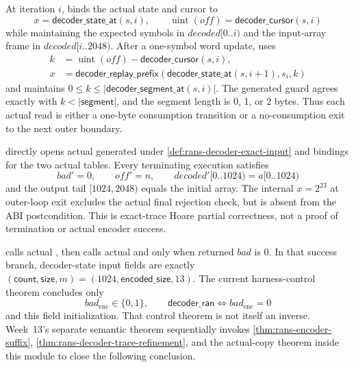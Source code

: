 \begin{definition}
\label{def:rans-decoder-trace-invariants}
At iteration \(i\),  binds the actual
state and cursor to
\[
  x=\mathsf{decoder\_state\_at}(s,i),\qquad
  \operatorname{uint}(off)=\mathsf{decoder\_cursor}(s,i)
\]
while maintaining the expected symbols in \(decoded[0..i)\) and the input-array
frame in \(decoded[i..2048)\). After a one-symbol word update,
 uses
\[
\begin{aligned}
  k&=\operatorname{uint}(off)-\mathsf{decoder\_cursor}(s,i),\\
  x&=\mathsf{decoder\_replay\_prefix}
       (\mathsf{decoder\_state\_at}(s,i+1),s_i,k)
\end{aligned}
\]
and maintains \(0\le k\le|\mathsf{decoder\_segment\_at}(s,i)|\). The generated
guard agrees exactly with \(k<|\mathsf{segment}|\), and the segment length is
0, 1, or 2 bytes. Thus each actual read is either a one-byte consumption
transition or a no-consumption exit to the next outer boundary.
\end{definition}

\begin{verified}
\label{thm:rans-decoder-trace-refinement}
 directly opens actual
generated  under
\cref{def:rans-decoder-exact-input} and bindings for the two actual tables.
Every terminating execution satisfies
\[
  bad'=0,\qquad off'=n,\qquad
  decoded'[0..1024)=a[0..1024)
\]
and the output tail \([1024,2048)\) equals the initial array. The internal
\(x=2^{23}\) at outer-loop exit excludes the actual final rejection check,
but is absent from the ABI postcondition. This is exact-trace Hoare partial
correctness, not a proof of termination or actual encoder success.
\end{verified}

\begin{definition}
\label{def:rans-actual-harness}
 calls actual ,
then calls actual  and
 only when returned \(bad\) is 0. In that success
branch, decoder-state input fields are exactly
\((\mathsf{count},\mathsf{size},m)=(1024,\mathsf{encoded\_size},13)\).
The current harness-control theorem concludes only
\[
  bad_{\mathrm{enc}}\in\{0,1\},\qquad
  \mathsf{decoder\_ran}\Longleftrightarrow bad_{\mathrm{enc}}=0
\]
and this field initialization. That control theorem is not itself an inverse.
Week~13's separate semantic theorem sequentially invokes
\cref{thm:rans-encoder-suffix}, \cref{thm:rans-decoder-trace-refinement}, and the
actual-copy theorem inside this module to close the following conclusion.
\end{definition}

